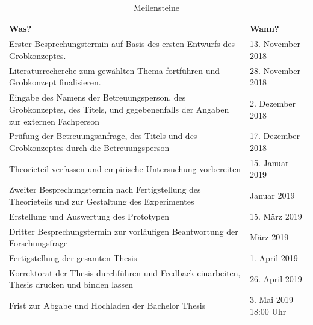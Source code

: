 \documentclass{hwz}
\begin{document}
\begin{table}[h]
\centering
    \caption{Meilensteine}
    \renewcommand{\arraystretch}{1.25}
    \setlength{\tabcolsep}{15pt}
    \begin{tabular}{ | p{8cm} | l |}
    \hline
    \rowcolor{ccc} Was? & Wann? \\ \hline
    Erster Besprechungstermin auf Basis des ersten Entwurfs des Grobkonzeptes. & 13. November 2018 \\ \hline
    
    Literaturrecherche zum gewählten Thema fortführen und Grobkonzept finalisieren. & 28. November 2018 \\ \hline
    
    \rowcolor{orange} Eingabe des Namens der Betreuungsperson, des Grobkonzeptes, des Titels, und gegebenenfalls der Angaben zur externen Fachperson & 2. Dezember 2018 \\ \hline
    
    Prüfung der Betreuungsanfrage, des Titels und des Grobkonzeptes durch die Betreuungsperson & 17. Dezember 2018 \\ \hline
    
    Theorieteil verfassen und empirische Untersuchung vorbereiten & 15. Januar 2019 \\ \hline
    
    Zweiter Besprechungstermin nach Fertigstellung des Theorieteils und zur Gestaltung des Experimentes & Januar 2019 \\ \hline
    
    Erstellung und Auswertung des Prototypen & 15. März 2019 \\ \hline
    
    Dritter Besprechungstermin zur vorläufigen Beantwortung der Forschungsfrage & März 2019 \\ \hline
    
    Fertigstellung der gesamten Thesis & 1. April 2019 \\ \hline
    
    Korrektorat der Thesis durchführen und Feedback einarbeiten, Thesis drucken und binden lassen & 26. April 2019 \\ \hline
    
    \rowcolor{orange} Frist zur Abgabe und Hochladen der Bachelor Thesis & 3. Mai 2019 18:00 Uhr \\ \hline
    
    \end{tabular}
\end{table}
\end{document}
